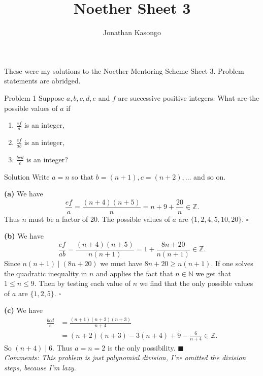 \documentclass{article}
\title{Noether Sheet 3}
\author{Jonathan Kasongo}
\begin{document}
\maketitle
\centerline{
These were my solutions to the Noether Mentoring Scheme Sheet 3. Problem
statements are abridged.
}

\begin{problem}{Problem 1}
Suppose $a,b,c,d,e$ and $f$ are successive positive integers. What are the
possible values of $a$ if

\begin{enumerate}[label=(\alph*)]
  \item $\frac{ef}{a}$ is an integer,
  \item $\frac{ef}{ab}$ is an integer,
  \item $\frac{bcd}{e}$ is an integer?
\end{enumerate}
\end{problem}

\begin{solution}{Solution}
Write $a = n$ so that $b = (n+1), c=(n+2),\ldots$ and so on.
\vspace{0.2cm}

\textbf{(a)} We have
$$
\frac{ef}{a} = \frac{(n+4)(n+5)}{n} = n + 9 + \frac{20}{n} \in \mathbb{Z}.
$$
Thus $n$ must be a factor of 20. The possible values of $a$ are
$\{1,2,4,5,10,20\}$. $\square$ \vspace{0.2cm}

\textbf{(b)} We have
$$
\frac{ef}{ab} = \frac{(n+4)(n+5)}{n(n+1)} = 1 + \frac{8n+20}{n(n+1)} \in
\mathbb{Z}.
$$
Since $n(n+1) \mid (8n+20)$ we must have $8n+20 \geq n(n+1)$. If one solves
the quadratic inequality in $n$ and applies the fact that $n \in
\mathbb{N}$ we get that $1 \leq n \leq 9$. Then by testing each value of
$n$ we find that the only possible values of $a$ are
$\{ 1,2,5 \}$. $\square$ \vspace{0.2cm}

\textbf{(c)} We have
\[
\begin{aligned}
\frac{bcd}{e} &= \frac{(n+1)(n+2)(n+3)}{n+4}\\
&= (n+2)(n+3) - 3(n+4) + 9 - \frac{6}{n+4} \in \mathbb{Z}.
\end{aligned}
\]
So $(n+4) \mid 6$. Thus $a = n = 2$ is the only possibility. $\blacksquare$
\\

\textit{Comments: This problem is just polynomial division, I've omitted
the division steps, because I'm lazy. }
\end{solution}
\newpage
\end{document}
